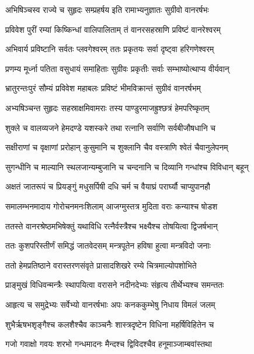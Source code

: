 \twolineshloka
{अभिषिञ्चस्व राज्ये च सुहृदः सम्प्रहर्षय}
{इति रामाभ्यनुज्ञातः सुग्रीवो वानरर्षभः} %

\twolineshloka
{प्रविवेश पुरीं रम्यां किष्किन्धां वालिपालिताम्}
{तं वानरसहस्राणि प्रविष्टं वानरेश्वरम्} %

\twolineshloka
{अभिवार्य प्रविष्टानि सर्वतः प्लवगेश्वरम्}
{ततः प्रकृतयः सर्वा दृष्ट्वा हरिगणेश्वरम्} %

\twolineshloka
{प्रणम्य मूर्ध्ना पतिता वसुधायं समाहिताः}
{सुग्रीवः प्रकृतीः सर्वाः सम्भाष्योत्थाप्य वीर्यवान्} %

\twolineshloka
{भ्रातुरन्तःपुरं सौम्यं प्रविवेश महाबलः}
{प्रविष्टं भीमविक्रान्तं सुग्रीवं वानरर्षभम्} %

\twolineshloka
{अभ्यषिञ्चन्त सुहृदः सहस्राक्षमिवामराः}
{तस्य पाण्डुरमाजह्रुश्छत्रं हेमपरिष्कृतम्} %

\twolineshloka
{शुक्ले च वालव्यजने हेमदण्डे यशस्करे}
{तथा रत्नानि सर्वाणि सर्वबीजौषधानि च} %

\twolineshloka
{सक्षीराणां च वृक्षाणां प्ररोहान् कुसुमानि च}
{शुक्लानि चैव वस्त्राणि श्वेतं चैवानुलेपनम्} %

\twolineshloka
{सुगन्धीनि च माल्यानि स्थलजान्यम्बुजानि च}
{चन्दनानि च दिव्यानि गन्धांश्च विविधान् बहून्} %

\twolineshloka
{अक्षतं जातरूपं च प्रियङ्गुं मधुसर्पिषी}
{दधि चर्म च वैयाघ्रं परार्घ्यौ चाप्युपानहौ} %

\twolineshloka
{समालम्भनमादाय गोरोचनमनःशिलाम्}
{आजग्मुस्तत्र मुदिता वराः कन्याश्च षोडश} %

\twolineshloka
{ततस्ते वानरश्रेष्ठमभिषेक्तुं यथाविधि}
{रत्नैर्वस्त्रैश्च भक्ष्यैश्च तोषयित्वा द्विजर्षभान्} %

\twolineshloka
{ततः कुशपरिस्तीर्णं समिद्धं जातवेदसम्}
{मन्त्रपूतेन हविषा हुत्वा मन्त्रविदो जनाः} %

\twolineshloka
{ततो हेमप्रतिष्ठाने वरास्तरणसंवृते}
{प्रासादशिखरे रम्ये चित्रमाल्योपशोभिते} %

\twolineshloka
{प्राङ्मुखं विधिवन्मन्त्रैः स्थापयित्वा वरासने}
{नदीनदेभ्यः संहृत्य तीर्थेभ्यश्च समन्ततः} %

\twolineshloka
{आहृत्य च समुद्रेभ्यः सर्वेभ्यो वानरर्षभाः}
{अपः कनककुम्भेषु निधाय विमलं जलम्} %

\twolineshloka
{शुभैर्ऋषभशृङ्गैश्च कलशैश्चैव काञ्चनैः}
{शास्त्रदृष्टेन विधिना महर्षिविहितेन च} %

\twolineshloka
{गजो गवाक्षो गवयः शरभो गन्धमादनः}
{मैन्दश्च द्विविदश्चैव हनूमाञ्जाम्बवांस्तथा} %

